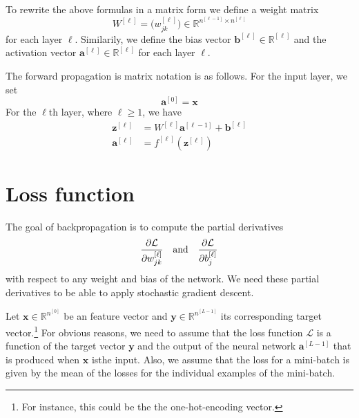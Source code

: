 \documentclass[12pt]{article}
\newcommand{\R}{\mathbb{R}}
\newcommand{\x}{\boldsymbol{x}}
\renewcommand{\a}{\boldsymbol{a}}
\renewcommand{\b}{\boldsymbol{b}}
\newcommand{\z}{\boldsymbol{z}}
\newcommand{\y}{\boldsymbol{y}}
\newcommand{\cL}{\mathcal{L}}
\begin{document}
To rewrite the above formulas in a matrix form we define a weight matrix
\begin{equation}
W^{[\ell]} = \Big( w^{[\ell]}_{jk} \Big) \in \R^{n^{[\ell-1]} \times n^{[\ell]}}
\end{equation}
for each layer $\ell$. Similarily, we define the bias vector $\b^{[\ell]}\in\R^{[\ell]}$ and the activation vector $\a^{[\ell]}\in\R^{[\ell]}$ for each layer $\ell$.

The forward propagation is matrix notation is as follows. For the input layer, we set
\begin{equation}
\a^{[0]} = \x 
\end{equation}
For the $\ell$th layer, where $\ell\ge 1$, we have
\begin{align}
\z^{[\ell]} &= W^{[\ell]} \a^{[\ell-1]} + \b^{[\ell]} \\
\a^{[\ell]} &= f^{[\ell]} (\z^{[\ell]})
\end{align}

\section{Loss function}
The goal of backpropagation is to compute the partial derivatives
\begin{equation}
{\partial \cL \over \partial w^{[\ell]}_{jk}}  \quad\mbox{and} \quad {\partial \cL \over \partial b^{[\ell]}_j}
\end{equation}
with respect to any weight and bias of the network. We need these partial derivatives to be able to apply stochastic gradient descent.

Let $\x\in\R^{n^{[0]}}$ be an feature vector and $\y\in\R^{n^{[L-1]}}$ its corresponding target vector.\footnote{For instance, this could be the the one-hot-encoding vector.} 
For obvious reasons, we need to assume that the loss function $\cL$ is a function of the target vector $\y$ and the output of the neural network $\a^{[L-1]}$ that is produced when $\x$ isthe input. Also, we assume that the loss for a mini-batch is given by the mean of the losses for the individual examples of the mini-batch.
\end{document}
